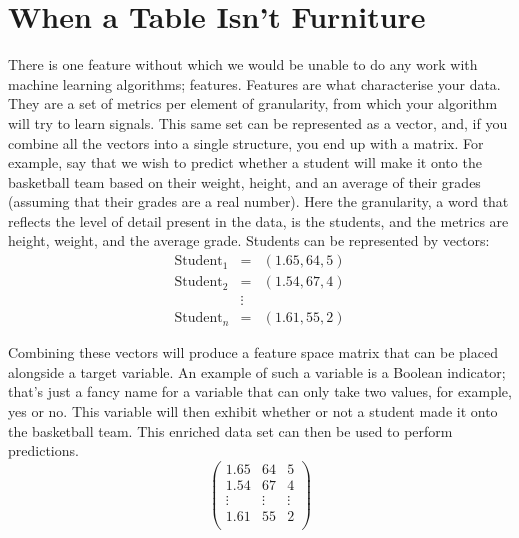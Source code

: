\documentclass[a4,12pt,twosided,openany]{memoir}
\begin{document}
\section{When a Table Isn’t Furniture}
\par 
\indent
There is one feature without which we would be unable to do any work with machine learning algorithms; features. Features are what characterise your data. They are a set of metrics per element of granularity, from which your algorithm will try to learn signals. This same set can be represented as a vector, and, if you combine all the vectors into a single structure, you end up with a matrix. For example, say that we wish to predict whether a student will make it onto the basketball team based on their weight, height, and an average of their grades (assuming that their grades are a real number). Here the granularity, a word that reflects the level of detail present in the data, is the students, and the metrics are height, weight, and the average grade. Students can be represented by vectors:
\begin{eqnarray*}
 \textrm{Student}_1  &=&  (1.65, 64, 5) \\
 \textrm{Student}_2 &=& (1.54, 67, 4) \\
        &\vdots& \\
  \textrm{Student}_n &=& (1.61, 55,2)
\end{eqnarray*}

Combining these vectors will produce a feature space matrix that can be placed alongside a target variable. An example of such a variable is a Boolean indicator; that’s just a fancy name for a variable that can only take two values, for example, yes or no. This variable will then exhibit whether or not a student made it onto the basketball team. This enriched data set can then be used to perform predictions.
\[
\begin{pmatrix}
1.65 & 64 & 5 \\
1.54 & 67 & 4 \\
\vdots & \vdots & \vdots\\
1.61 & 55 & 2\\
\end{pmatrix}
\]
\end{document}
